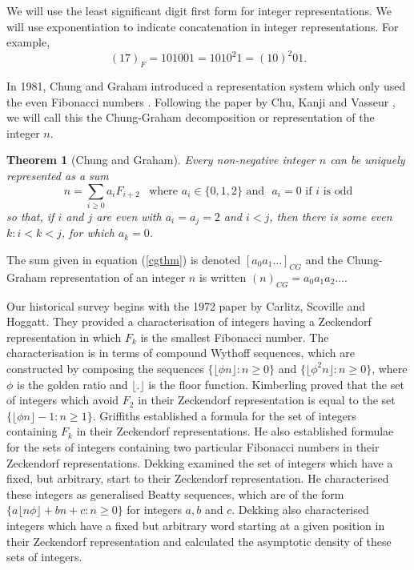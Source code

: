 \documentclass[12pt]{article}
\theoremstyle{plain}
\newtheorem{theorem}{Theorem}
\theoremstyle{case}
\theoremstyle{definition}
\begin{document}
We will use the least significant digit first form for integer representations. We will use exponentiation to indicate concatenation in integer representations. For example, 
$$
(17)_F = 1 0 1 0 0 1 = 1 0 1 0^2 1 = (10)^2 0 1 .
$$

In 1981, Chung and Graham introduced a representation system which only used the even Fibonacci numbers \cite{CG1981}. Following the paper by Chu, Kanji and Vasseur \cite{Chu:2025aa}, we will call this the Chung-Graham decomposition or representation of the integer $n$.

\bigskip

\begin{theorem}[Chung and Graham]
\label{cglemma}
Every non-negative integer $n$ can be uniquely represented as a sum
\begin{equation}
\label{cgthm}
n = \sum_{i \geq 0} a_i F_{i+2} \,\,\, \text{ where } a_i \in \{0, 1, 2 \} \text{ and } \,\, a_i = 0 \text{ if $i$ is odd}
\end{equation}
so that, if $ i$ and $j$ are even with $a_i = a_j = 2$ and $i < j$, then there is some even $k: i < k< j$, for which $a_k = 0$.
\end{theorem}

\bigskip

The sum given in equation (\ref{cgthm}) is denoted $[a_0 a_1 \dots]_{CG}$ and the Chung-Graham representation of an integer $n$ is written $(n)_{CG} = a_0 a_1 a_2 \dots$. 

Our historical survey begins with the 1972 paper by Carlitz, Scoville and Hoggatt.\cite{Carlitz_1972} They provided a characterisation of integers having a Zeckendorf representation in which $F_k$ is the smallest Fibonacci number. The characterisation is in terms of compound Wythoff sequences, which are constructed by composing the sequences $\{  \lfloor \phi n \rfloor : n \geq 0 \}$ and $\{ \lfloor \phi^2 n \rfloor : n \geq 0 \}$, where $\phi$ is the golden ratio and $\lfloor . \rfloor$ is the floor function. Kimberling \cite{Kimberling_1983} proved that the set of integers which avoid $F_2$ in their Zeckendorf representation is equal to the set $\{\lfloor \phi  n \rfloor - 1 : n \geq 1 \}$. Griffiths established a formula for the set of integers containing $F_k$ in their Zeckendorf representations. He also established formulae for the sets of integers containing two particular Fibonacci numbers in their Zeckendorf representations. Dekking \cite{https://doi.org/10.5281/zenodo.10803363} examined the set of integers which have a fixed, but arbitrary, start to their Zeckendorf representation. He characterised these integers as generalised Beatty sequences, which are of the form $\{ a \lfloor n \phi \rfloor + b n + c : n \geq 0 \}$ for integers $a,b$ and $c$. Dekking also characterised integers which have a fixed but arbitrary word starting at a given position in their Zeckendorf representation and calculated the asymptotic density of these sets of integers.
\end{document}
